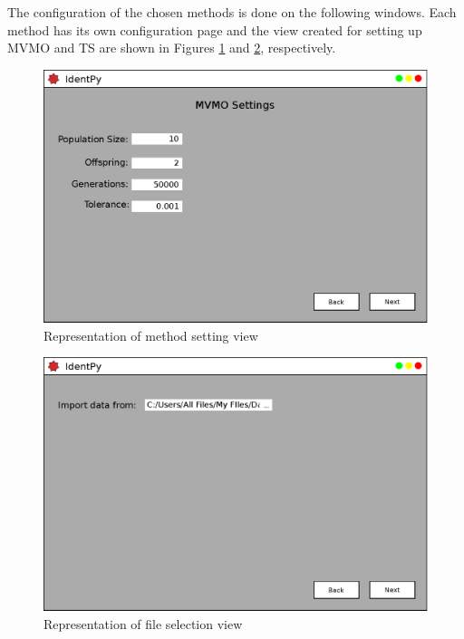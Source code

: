 The configuration of the chosen methods is done on the following windows. Each method has its own configuration page and the view created for setting up MVMO and TS are shown in Figures \ref{fig: MVMO_page} and \ref{fig: TS_page}, respectively.

\begin{figure}[h]
	\caption{Representation of method setting view}
	\begin{center}
		\includegraphics[scale=.5]{Images/Software_pg3.eps}
	\end{center}
	\label{fig: MVMO_page}
\end{figure}

\begin{figure}[h]
	\caption{Representation of file selection view}
	\begin{center}
		\includegraphics[scale=.5]{Images/Software_pg4.eps}
	\end{center}
	\label{fig: TS_page}
\end{figure}

